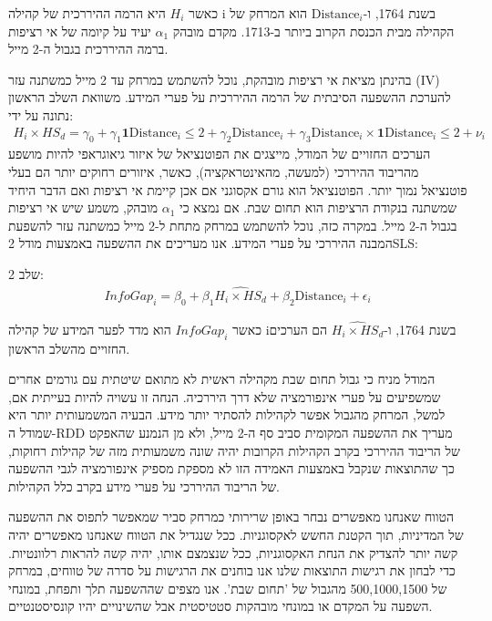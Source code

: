 כאשר $H_i$ היא הרמה ההיררכית של קהילה i בשנת 1764, ו-$\text{Distance}_i$ הוא המרחק של הקהילה מבית הכנסת הקרוב ביותר ב-1713. מקדם מובהק $\alpha_1$ יעיד על קיומה של אי רציפות ברמה ההיררכית בגבול ה-2 מייל.

בהינתן מציאת אי רציפות מובהקת, נוכל להשתמש במרחק עד 2 מייל כמשתנה עזר (IV) להערכת ההשפעה הסיבתית של הרמה ההיררכית על פערי המידע. משוואת השלב הראשון נתונה על ידי:
\begin{align}
H_i \times HS_{d} = \gamma_0 + \gamma_1 \mathbf{1}{\text{Distance}_i \leq 2} + \gamma_2 \text{Distance}_i + \gamma_3 \text{Distance}_i \times \mathbf{1}{\text{Distance}_i \leq 2} + \nu_i
\end{align}
הערכים החזויים של המודל, מייצגים את הפוטנציאל של איזור גיאוגראפי להיות מושפע מהריבוד ההיררכי (למעשה, מהאינטראקציה), כאשר, איזורים רחוקים יותר הם בעלי פוטנציאל נמוך יותר. הפוטנציאל הוא גורם אקסוגני אם אכן קיימת אי רציפות ואם הדבר היחיד שמשתנה בנקודת הרציפות הוא תחום שבת. אם נמצא כי $\alpha_1$ מובהק, משמע שיש אי רציפות בגבול ה-2 מייל. במקרה כזה, נוכל להשתמש במרחק מתחת ל-2 מייל כמשתנה עזר להשפעת המבנה ההיררכי על פערי המידע. אנו מעריכים את ההשפעה באמצעות מודל 2SLS:

שלב 2: 
\begin{align}
InfoGap_{i} = \beta_0 + \beta_1 \widehat{H_{i} \times HS_{d}} + \beta_2 \text{Distance}_i + \epsilon_i
\end{align}

כאשר $InfoGap_{i}$ הוא מדד לפער המידע של קהילה iבשנת 1764, ו-$\widehat{H_{i} \times HS_{d}}$ הם הערכים החזויים מהשלב הראשון.

המודל מניח כי גבול תחום שבת מקהילה ראשית לא מתואם שיטתית עם גורמים אחרים שמשפיעים על פערי אינפורמציה שלא דרך היררכיה. הנחה זו עשויה להיות בעייתית אם, למשל, המרחק מהגבול אפשר לקהילות להסתיר יותר מידע. הבעיה המשמעותית יותר היא שמודל ה-RDD מעריך את ההשפעה המקומית סביב סף ה-2 מייל, ולא מן הנמנע שהאפקט של הריבוד ההיררכי בקרב הקהילות הקרובות יהיה שונה משמעותית מזה של קהילות רחוקות, כך שהתוצאות שנקבל באמצעות האמידה הזו לא מספקת מספיק אינפורמציה לגבי ההשפעה של הריבוד ההיררכי על פערי מידע בקרב כלל הקהילות.

הטווח שאנחנו מאפשרים נבחר באופן שרירותי כמרחק סביר שמאפשר לתפוס את ההשפעה של המדיניות, תוך הקטנת החשש לאקסוגניות. ככל שנגדיל את הטווח שאנחנו מאפשרים יהיה קשה יותר להצדיק את הנחת האקסוגניות, ככל שנצמצם אותו, יהיה קשה להראות רלוונטיות. כדי לבחון את רגישות התוצאות שלנו אנו בוחנים את הרגישות על סדרה של טווחים, במרחק של 500,1000,1500 מהגבול של 'תחום שבת'. אנו מצפים שההשפעה תלך ותפחת, במונחי השפעה על המקדם או במונחי מובהקות סטטיסטית אבל שהשינויים יהיו קונסיסטנטיים. 

